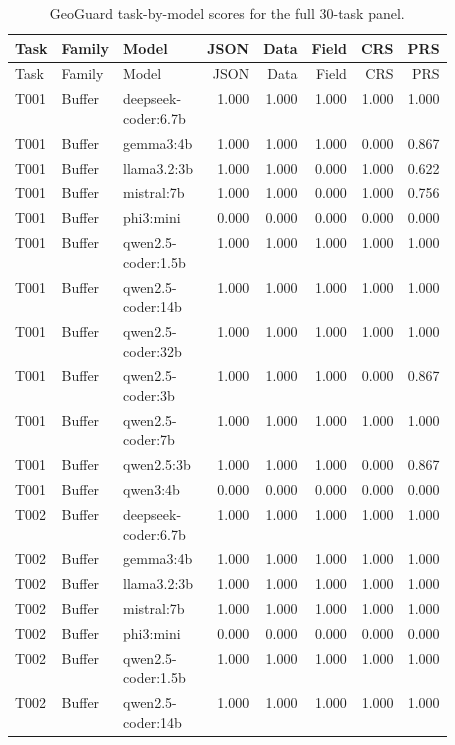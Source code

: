 \small
\begin{longtable}{p{0.08\linewidth}p{0.16\linewidth}p{0.27\linewidth}rrrrr}
\caption{GeoGuard task-by-model scores for the full 30-task panel.}\label{tab:geoguard-task-model-long}\\
\toprule
Task & Family & Model & JSON & Data & Field & CRS & PRS \\
\midrule
\endfirsthead
\toprule
Task & Family & Model & JSON & Data & Field & CRS & PRS \\
\midrule
\endhead
T001 & Buffer & deepseek-coder:6.7b & 1.000 & 1.000 & 1.000 & 1.000 & 1.000 \\
T001 & Buffer & gemma3:4b & 1.000 & 1.000 & 1.000 & 0.000 & 0.867 \\
T001 & Buffer & llama3.2:3b & 1.000 & 1.000 & 0.000 & 1.000 & 0.622 \\
T001 & Buffer & mistral:7b & 1.000 & 1.000 & 0.000 & 1.000 & 0.756 \\
T001 & Buffer & phi3:mini & 0.000 & 0.000 & 0.000 & 0.000 & 0.000 \\
T001 & Buffer & qwen2.5-coder:1.5b & 1.000 & 1.000 & 1.000 & 1.000 & 1.000 \\
T001 & Buffer & qwen2.5-coder:14b & 1.000 & 1.000 & 1.000 & 1.000 & 1.000 \\
T001 & Buffer & qwen2.5-coder:32b & 1.000 & 1.000 & 1.000 & 1.000 & 1.000 \\
T001 & Buffer & qwen2.5-coder:3b & 1.000 & 1.000 & 1.000 & 0.000 & 0.867 \\
T001 & Buffer & qwen2.5-coder:7b & 1.000 & 1.000 & 1.000 & 1.000 & 1.000 \\
T001 & Buffer & qwen2.5:3b & 1.000 & 1.000 & 1.000 & 0.000 & 0.867 \\
T001 & Buffer & qwen3:4b & 0.000 & 0.000 & 0.000 & 0.000 & 0.000 \\
T002 & Buffer & deepseek-coder:6.7b & 1.000 & 1.000 & 1.000 & 1.000 & 1.000 \\
T002 & Buffer & gemma3:4b & 1.000 & 1.000 & 1.000 & 1.000 & 1.000 \\
T002 & Buffer & llama3.2:3b & 1.000 & 1.000 & 1.000 & 1.000 & 1.000 \\
T002 & Buffer & mistral:7b & 1.000 & 1.000 & 1.000 & 1.000 & 1.000 \\
T002 & Buffer & phi3:mini & 0.000 & 0.000 & 0.000 & 0.000 & 0.000 \\
T002 & Buffer & qwen2.5-coder:1.5b & 1.000 & 1.000 & 1.000 & 1.000 & 1.000 \\
T002 & Buffer & qwen2.5-coder:14b & 1.000 & 1.000 & 1.000 & 1.000 & 1.000 \\

\end{longtable}
